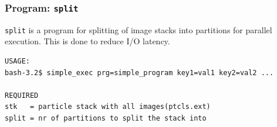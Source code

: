 \documentclass[a4paper,11pt]{article}
\newcommand{\prgname}[1]{\textcolor{NavyBlue}{\texttt{#1}}}
\begin{document}
\subsubsection{Program: \prgname{split}}
\label{split}
\prgname{split} is a program for splitting of image stacks into partitions for parallel execution. This is done to reduce I/O latency.

\begin{verbatim}
USAGE:
bash-3.2$ simple_exec prg=simple_program key1=val1 key2=val2 ...

REQUIRED
stk   = particle stack with all images(ptcls.ext)
split = nr of partitions to split the stack into
\end{verbatim}
\end{document}
